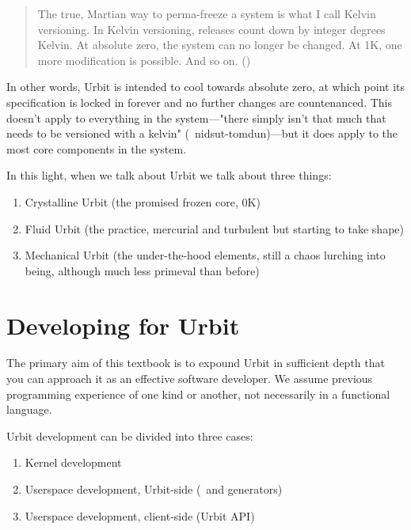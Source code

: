 {{{{\begin{quote}
The true, Martian way to perma-freeze a system is what I call Kelvin versioning.  In Kelvin versioning, releases count down by integer degrees Kelvin.  At absolute zero, the system can no longer be changed.  At 1K, one more modification is possible.  And so on.  (\cite{Yarvin2017})
\end{quote}

In other words, Urbit is intended to cool towards absolute zero, at which point its specification is locked in forever and no further changes are countenanced.  This doesn't apply to everything in the system—"there simply isn't that much that needs to be versioned with a kelvin" (~nidsut-tomdun)—but it does apply to the most core components in the system.


In this light, when we talk about Urbit we talk about three things:

\begin{enumerate}
	\item  Crystalline Urbit (the promised frozen core, 0K)
  \item  Fluid Urbit (the practice, mercurial and turbulent but starting to take shape)
  \item  Mechanical Urbit (the under-the-hood elements, still a chaos lurching into being, although much less primeval than before)
\end{enumerate}


\section{Developing for Urbit}

The primary aim of this textbook is to expound Urbit in sufficient depth that you can approach it as an effective software developer.  We assume previous programming experience of one kind or another, not necessarily in a functional language.

Urbit development can be divided into three cases:

\begin{enumerate}
	\item  Kernel development
	\item  Userspace development, Urbit-side (\gall~and generators)
	\item  Userspace development, client-side (Urbit API)
\end{enumerate}


}}}}
